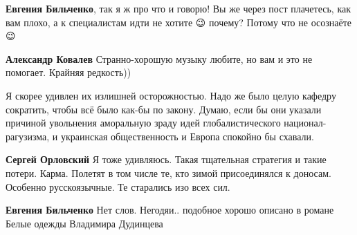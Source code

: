 \begin{itemize}
\begin{itemize}
 
\textbf{Евгения Бильченко}, так я ж про что и говорю! Вы же через пост плачетесь, как вам плохо, а к специалистам идти не хотите 😉 почему? Потому что не осознаёте 😉

 
\textbf{Александр Ковалев} Странно-хорошую музыку любите, но вам и это не помогает. Крайняя редкость))

\end{itemize}

 

Я скорее удивлен их излишней осторожностью. Надо же было целую кафедру
сократить, чтобы всё было как-бы по закону. Думаю, если бы они указали причиной
увольнения аморальную зраду идей глобалистического национал-рагузизма, и
украинская общественность и Европа спокойно бы схавали.

\begin{itemize}
 
\textbf{Сергей Орловский} Я тоже удивляюсь. Такая тщательная стратегия и такие потери. Карма. Полетят в том числе те, кто зимой присоединялся к доносам. Особенно русскоязычные. Те старались изо всех сил.

 
\textbf{Евгения Бильченко} Нет слов. Негодяи.. подобное хорошо описано в романе Белые одежды Владимира Дудинцева
\end{itemize}


\end{itemize}
